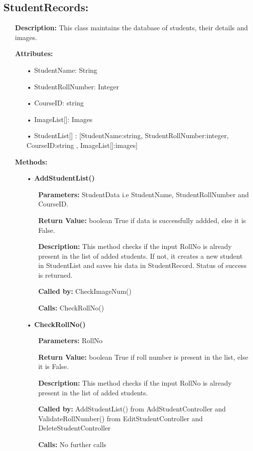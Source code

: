 \documentclass{scrreprt}
\begin{document}
\subsection{StudentRecords: }
\begin{enumerate}
\item[] \textbf{Description:} This class maintains the database of students, their details and images.
\item[] \textbf{Attributes:}
\begin{itemize}
\item [•] StudentName: String
\item [•] StudentRollNumber: Integer
\item [•] CourseID: string
\item [•] ImageList[]: Images
\item [•] StudentList[] : [StudentName:string, StudentRollNumber:integer, CourseID:string , ImageList[]:images] 
\end{itemize}
\item[]
\textbf{Methods:}
\begin{itemize}
\item [•] \textbf{AddStudentList()}
\begin{itemize}
\item [] \textbf{Parameters:} StudentData i.e StudentName, StudentRollNumber and CourseID.
\item [] \textbf{Return Value:} boolean True if data is successfully addded, else it is False.
\item [] \textbf{Description:} This method checks if the input RollNo is already present in the list of added students. If not, it creates a new student in StudentList and saves his data in StudentRecord. Status of success is returned.
\item [] \textbf{Called by:} CheckImageNum()
\item [] \textbf{Calls:} CheckRollNo()
\end{itemize}
\item [•] \textbf{CheckRollNo()}
\begin{itemize}	
\item [] \textbf{Parameters:} RollNo
\item [] \textbf{Return Value:} boolean True if roll number is present in the list, else it is False.
\item [] \textbf{Description:} This method checks if the input RollNo is already present in the list of added students.
\item [] \textbf{Called by:} AddStudentList() from AddStudentController and ValidateRollNumber() from EditStudentController and DeleteStudentController
\item [] \textbf{Calls:} No further calls
\end{itemize}


\end{itemize}
\end{enumerate}
\end{document}
